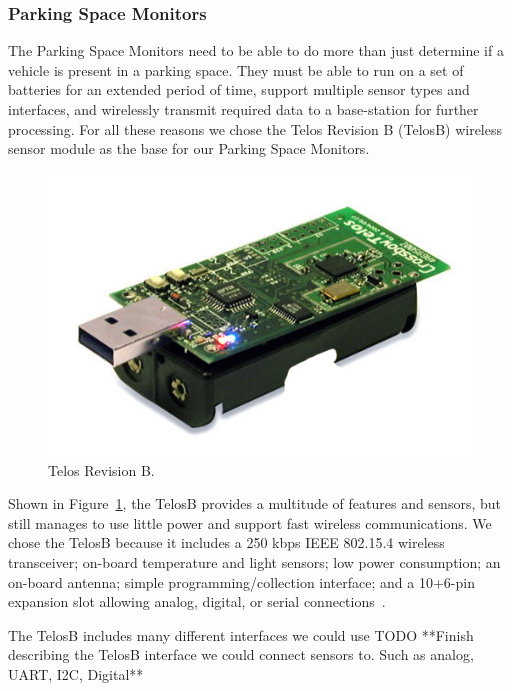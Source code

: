 \documentclass{acm_proc}
\begin{document}
\subsubsection{Parking Space Monitors}

The Parking Space Monitors need to be able to do more than just determine if a vehicle is present in a parking space.  They must be able to run on a set of batteries for an extended period of time, support multiple sensor types and interfaces, and wirelessly transmit required data to a base-station for further processing.  For all these reasons we chose the Telos Revision B (TelosB) wireless sensor module as the base for our Parking Space Monitors.

\begin{figure}
    \begin{center}
		\includegraphics[width=\columnwidth]{figures/telosb}
	\end{center}
	\caption{Telos Revision B.}
	\label{fig:telosb}
\end{figure}


Shown in Figure~\ref{fig:telosb}, the TelosB provides a multitude of
features and sensors, but still manages to use little power and support
fast wireless communications.  We chose the TelosB because it includes a
250 kbps IEEE 802.15.4 wireless transceiver; on-board temperature and light
sensors; low power consumption; an on-board antenna; simple
programming/collection interface; and a 10+6-pin expansion slot allowing
analog, digital, or serial connections~\cite{moteiv:telosb}.

The TelosB includes many different interfaces we could use 
TODO **Finish describing the TelosB interface we could connect sensors to.  Such as analog, UART, I2C, Digital**
\end{document}

